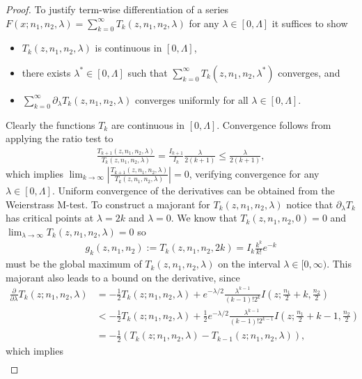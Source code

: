 \begin{proof}
To justify term-wise differentiation of a series  $F(x;n_1,n_2,\lambda) = \sum_{k=0}^\infty T_k(z,n_1,n_2,\lambda)$ for any $\lambda\in[0,\Lambda]$ it suffices to show 
\begin{itemize}
    \item $T_k(z,n_1,n_2,\lambda)$ is continuous in $[0,\Lambda]$,
    \item there exists $\lambda^* \in [0,\Lambda]$ such that $\sum_{k=0}^\infty T_k(z,n_1,n_2,\lambda^*)$ converges, and
    \item $\sum_{k=0}^\infty \partial_\lambda T_k(z,n_1,n_2,\lambda)$ converges uniformly for all $\lambda\in[0,\Lambda]$.
\end{itemize}
Clearly the functions $T_k$ are continuous in $[0,\Lambda]$. Convergence follows from applying the ratio test to
\begin{align}
     \frac{T_{k+1}(z,n_1,n_2,\lambda)}{T_k(z,n_1,n_2,\lambda)} = \frac{I_{k+1}}{I_k}  \frac{\lambda}{2(k+1)} \leq \frac{\lambda}{2(k+1)},
\end{align}
which implies $\lim_{k\to\infty} \left|  \frac{T_{k+1}(z,n_1,n_2,\lambda)}{T_k(z,n_1,n_2,\lambda)} \right| =0$, verifying convergence for any $\lambda\in[0,\Lambda]$. 
Uniform convergence of the derivatives can be obtained from the Weierstrass M-test. To construct a majorant for $T_k(z,n_1,n_2,\lambda)$ notice that $\partial_\lambda T_k$  has critical points at $\lambda=2k$ and $\lambda =0$. We know that $T_k(z,n_1,n_2,0) = 0$ and $\lim_{\lambda \to \infty} T_k(z,n_1,n_2,\lambda) = 0$ so 
\begin{align}
 g_k(z,n_1,n_2) := T_k(z,n_1,n_2,2k)   = I_{k} \frac{k^k}{k!} e^{-k}
\end{align}
must be the global maximum of $T_k(z,n_1,n_2,\lambda)$ on the interval $\lambda\in[0,\infty)$. This majorant also leads to a bound on the derivative, since
\begin{align}
    \frac{\partial}{\partial \lambda} T_k(z;n_1,n_2,\lambda) &= - \frac{1}{2}T_k(z;n_1,n_2,\lambda) +  e^{-\lambda/2} \frac{ \lambda^{k-1}}{(k-1)! 2^k} I\left( z; \frac{n_1}{2} +k , \frac{n_2}{2}\right)\\
    &< - \frac{1}{2}T_k(z;n_1,n_2,\lambda) + \frac{1}{2}e^{-\lambda/2} \frac{\lambda^{k-1}}{(k-1)!2^{k-1}}I\left(z;\frac{n_1}{2}+k-1,\frac{n_2}{2}\right)\\
    &= - \frac{1}{2}\left( T_k\left(z;n_1,n_2,\lambda\right)  - T_{k-1}\left(z;n_1,n_2,\lambda\right)  \right),
\end{align}
which implies
\begin{align}

\end{align}
\end{proof}
